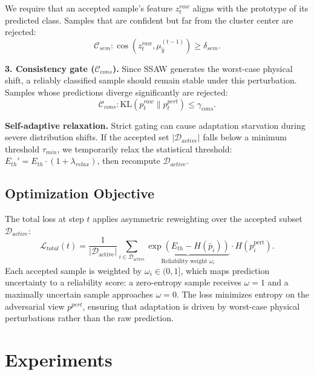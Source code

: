 \documentclass[sigconf, screen, review, anonymous]{acmart}
\theoremstyle{plain}
\theoremstyle{definition}
\theoremstyle{remark}
\begin{document}
	We require that an accepted sample's feature $z^{raw}_t$ aligns with the prototype of its predicted class. Samples that are confident but far from the cluster center are rejected:
	\begin{equation}
		\mathcal{C}_{sem}: \cos(z^{raw}_t, \mu_{\hat{y}}^{(t-1)}) \ge \delta_{sem}.
	\end{equation}

	\textbf{3. Consistency gate ($\mathcal{C}_{cons}$).}
	Since SSAW generates the worst-case physical shift, a reliably classified sample should remain stable under this perturbation. Samples whose predictions diverge significantly are rejected:
	\begin{equation}
		\mathcal{C}_{cons}: \text{KL}(p^{raw}_t \| p^{pert}_t) \le \gamma_{cons}.
	\end{equation}

	\textbf{Self-adaptive relaxation.}
	Strict gating can cause adaptation starvation during severe distribution shifts. If the accepted set $|\mathcal{D}_{active}|$ falls below a minimum threshold $\tau_{min}$, we temporarily relax the statistical threshold: $E_{th}' = E_{th} \cdot (1 + \lambda_{relax})$, then recompute $\mathcal{D}_{active}$.

\subsection{Optimization Objective}
\label{sec:optimization}

The total loss at step $t$ applies asymmetric reweighting over the
accepted subset $\mathcal{D}_{active}$:
\begin{equation}
	\mathcal{L}_{total}(t)
	=
	\frac{1}{|\mathcal{D}_{\mathrm{active}}|}
	\sum_{i \in \mathcal{D}_{\mathrm{active}}}
	\underbrace{\exp(E_{th} - H(\bar{p}_i))}_{\text{Reliability weight } \omega_i} \cdot
	H\!\left(p^{\mathrm{pert}}_i\right).
	\label{eq:total_objective}
\end{equation}
Each accepted sample is weighted by $\omega_i \in (0, 1]$, which maps prediction uncertainty to a reliability score: a zero-entropy sample receives $\omega=1$ and a maximally uncertain sample approaches $\omega=0$. The loss minimizes entropy on the adversarial view $p^{pert}$, ensuring that adaptation is driven by worst-case physical perturbations rather than the raw prediction.

\section{Experiments}
\label{sec:exp}
\end{document}
